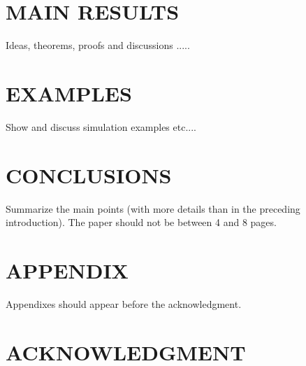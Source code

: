 \documentclass[letterpaper, 10 pt, conference]{ieeeconf}  %
\begin{document}
\section{MAIN RESULTS}

Ideas, theorems, proofs and discussions .....


\section{EXAMPLES}

Show and discuss simulation examples etc....



\section{CONCLUSIONS}

Summarize the main points (with more details than in the preceding introduction).
The paper should not be between 4 and 8 pages.



\addtolength{\textheight}{-12cm}   %



\section*{APPENDIX}

Appendixes should appear before the acknowledgment.

\section*{ACKNOWLEDGMENT}






\end{document}
